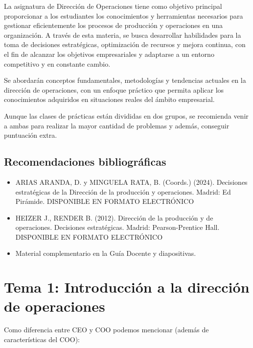 \documentclass[12pt]{report} %
\providecommand{\tightlist}{%
  \setlength{\itemsep}{0pt}\setlength{\parskip}{0pt}}
\begin{document}
La asignatura de Dirección de Operaciones tiene como objetivo principal
proporcionar a los estudiantes los conocimientos y herramientas
necesarios para gestionar eficientemente los procesos de producción y
operaciones en una organización. A través de esta materia, se busca
desarrollar habilidades para la toma de decisiones estratégicas,
optimización de recursos y mejora continua, con el fin de alcanzar los
objetivos empresariales y adaptarse a un entorno competitivo y en
constante cambio.

Se abordarán conceptos fundamentales, metodologías y tendencias actuales
en la dirección de operaciones, con un enfoque práctico que permita
aplicar los conocimientos adquiridos en situaciones reales del ámbito
empresarial.

Aunque las clases de prácticas están divididas en dos grupos, se
recomienda venir a ambas para realizar la mayor cantidad de problemas y
además, conseguir puntuación extra.

\hypertarget{recomendaciones-bibliogruxe1ficas}{%
\section{Recomendaciones
bibliográficas}\label{recomendaciones-bibliogruxe1ficas}}

\begin{itemize}
\tightlist
\item
  ARIAS ARANDA, D. y MINGUELA RATA, B. (Coords.) (2024). Decisiones
  estratégicas de la Dirección de la producción y operaciones. Madrid:
  Ed Pirámide. DISPONIBLE EN FORMATO ELECTRÓNICO\\
\item
  HEIZER J., RENDER B. (2012). Dirección de la producción y de
  operaciones. Decisiones estratégicas. Madrid: Pearson-Prentice Hall.
  DISPONIBLE EN FORMATO ELECTRÓNICO\\
\item
  Material complementario en la Guía Docente y diapositivas.
\end{itemize}

\hypertarget{tema-1-introducciuxf3n-a-la-direcciuxf3n-de-operaciones}{%
\chapter{Tema 1: Introducción a la dirección de
operaciones}\label{tema-1-introducciuxf3n-a-la-direcciuxf3n-de-operaciones}}

Como diferencia entre CEO y COO podemos mencionar (además de
características del COO):
\end{document}
